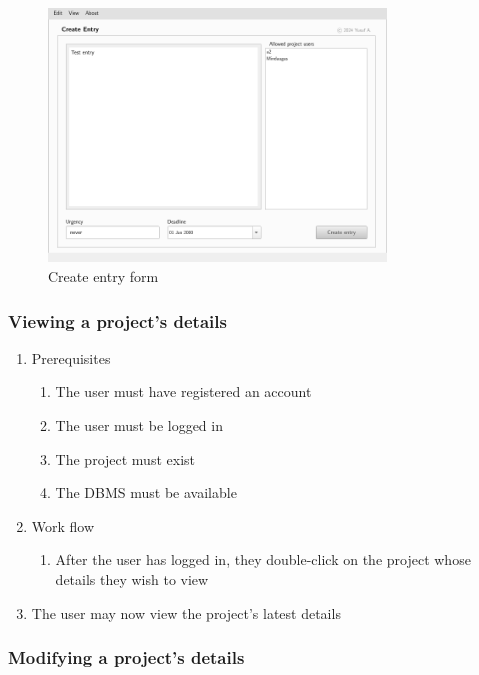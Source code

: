 \documentclass{report}
\begin{document}
	\begin{figure}[h]
		\centering
		\includegraphics[width=0.8\textwidth]{create-entry}
		\caption{Create entry form}
		\label{fig:create-entry}
	\end{figure}
	
	\subsubsection{Viewing a project's details}

	\begin{enumerate}
		\item Prerequisites
		\begin{enumerate}
			\item The user must have registered an account
			\item The user must be logged in
			\item The project must exist 
			\item The DBMS must be available
		\end{enumerate}
		\item Work flow
		\begin{enumerate}
			\item After the user has logged in, they double-click on the project whose details they wish
					  to view
		\end{enumerate}
		\item The user may now view the project's latest details
	\end{enumerate}	
	
	\subsubsection{Modifying a project's details}
	
\end{document}
